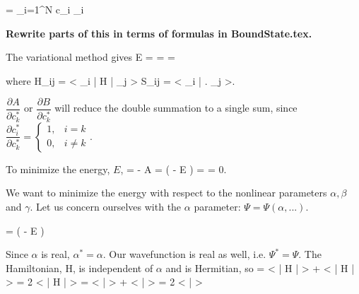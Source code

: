 \documentclass[Dissertation.tex]{subfiles}
\begin{document}
\beq
\Psi = \sum_{i=1}^N c_i \psi_i
\eeq

\textbf{Rewrite parts of this in terms of formulas in BoundState.tex.}

The variational method gives
\beq
E = 
  = 
  =  \equiv {}
\eeq

where
\beq
H_{ij} = \left< \psi_i \left| H \right| \psi_j \right>
S_{ij} = \left< \psi_i \left| \right.\! \psi_j \right>.
\eeq

$\dfrac{\partial A}{\partial c_k^*}$ or $\dfrac{\partial B}{\partial c_k^*}$ will reduce the double summation to a single sum, since 
$ \dfrac{\partial c_i^*}{\partial c_k^*} =
\begin{cases}
1,& i = k \\
0,& i \neq k
\end{cases}.$

To minimize the energy, $E$,
\beq
\label{eq:RRfinal}
 =   -   A
=  \left( - E \right)
=  = 0.
\eeq

We want to minimize the energy with respect to the nonlinear parameters $\alpha, \beta$ and $\gamma$.  Let us concern ourselves with the $\alpha$ parameter:  $\Psi = \Psi(\alpha, ...)$.

\beq
{} =  \left( - E  \right)
\label{eq:EnergyDerE1}
\eeq

Since $\alpha$ is real, $\alpha^* = \alpha$.  Our wavefunction is real as well, i.e. $\Psi^* = \Psi$.  The Hamiltonian, H, is independent of $\alpha$ and is Hermitian, so
\beq
{} = \left< \Psi \Big| H \Big| \frac{\partial\Psi}{\partial \alpha} \right> + 
    \left< \frac{\partial\Psi}{\partial \alpha} \Big| H \Big| \Psi \right> = 2 \left< \Psi \Big| H \Big| \frac{\partial\Psi}{\partial \alpha} \right>
\label{eq:EnergyDerPartA}
\eeq
\beq
{} = \left< \Psi \Big| \frac{\partial\Psi}{\partial \alpha} \right> + 
    \left< \frac{\partial\Psi}{\partial \alpha} \Big| \Psi \right> = 2 \left< \Psi \Big| \frac{\partial\Psi}{\partial \alpha} \right>
\label{eq:EnergyDerPartB}
\eeq
\end{document}
